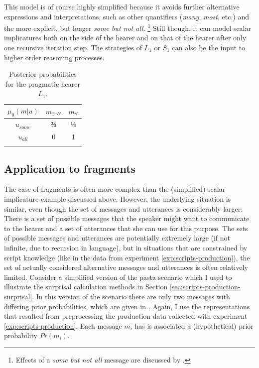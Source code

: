 This model is of course highly simplified because it avoids further alternative expressions and interpretations, such as other quantifiers (\textit{many}, \textit{most}, etc.) and the more explicit, but longer \textit{some but not all}.%
%
\footnote{Effects of a \textit{some but not all} message are discussed by \citet[77, 127]{franke2009}.}\afterfn%
%
Still though, it can model scalar implicatures both on the side of the hearer and on that of the hearer after only one recursive iteration step. The strategies of $L_1$ or $S_1$ can also be the input to higher order reasoning processes.

\begin{table}
\begin{tabular}{c c c}
 \lsptoprule
 $\mu_0(m|u)$ & $m_{\exists\neg\forall}$ & $m_{\forall}$\\
\midrule
$u_{\textit{some}}$ & ⅔ & ⅓ \\
$u_{\textit{all}}$ & 0 & 1\\
\lspbottomrule
\end{tabular}
\caption{Posterior probabilities for the pragmatic hearer $L_1$.\label{tab:gt-si-l1}}
\end{table}

\subsection{Application to fragments}
The case of fragments is often more complex than the (simplified) scalar implicature example discussed above. However, the underlying situation is similar, even though the set of messages and utterances is considerably larger: There is a set of possible messages that the speaker might want to communicate to the hearer and a set of utterances that she can use for this purpose. The sets of possible messages and utterances are potentially extremely large (if not infinite, due to recursion in language), but in situations that are constrained by script knowledge (like in the data from experiment \ref{exp:scripts-production}), the set of actually considered alternative messages and utterances is often relatively limited.  Consider a simplified version of the pasta scenario which I used to illustrate the surprisal calculation methods in Section \ref{sec:scripts-production-surprisal}. In this version of the scenario there are only two messages with differing prior probabilities, which are given in \Next. Again, I use the representations that resulted from preprocessing the production data collected with experiment \ref{exp:scripts-production}. Each message $m_i$ has is associated a (hypothetical) prior probability $Pr(m_i)$.

